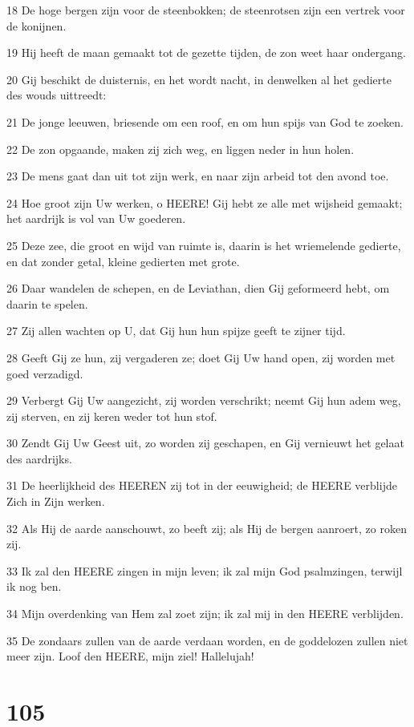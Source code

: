 \par 18 De hoge bergen zijn voor de steenbokken; de steenrotsen zijn een vertrek voor de konijnen.
\par 19 Hij heeft de maan gemaakt tot de gezette tijden, de zon weet haar ondergang.
\par 20 Gij beschikt de duisternis, en het wordt nacht, in denwelken al het gedierte des wouds uittreedt:
\par 21 De jonge leeuwen, briesende om een roof, en om hun spijs van God te zoeken.
\par 22 De zon opgaande, maken zij zich weg, en liggen neder in hun holen.
\par 23 De mens gaat dan uit tot zijn werk, en naar zijn arbeid tot den avond toe.
\par 24 Hoe groot zijn Uw werken, o HEERE! Gij hebt ze alle met wijsheid gemaakt; het aardrijk is vol van Uw goederen.
\par 25 Deze zee, die groot en wijd van ruimte is, daarin is het wriemelende gedierte, en dat zonder getal, kleine gedierten met grote.
\par 26 Daar wandelen de schepen, en de Leviathan, dien Gij geformeerd hebt, om daarin te spelen.
\par 27 Zij allen wachten op U, dat Gij hun hun spijze geeft te zijner tijd.
\par 28 Geeft Gij ze hun, zij vergaderen ze; doet Gij Uw hand open, zij worden met goed verzadigd.
\par 29 Verbergt Gij Uw aangezicht, zij worden verschrikt; neemt Gij hun adem weg, zij sterven, en zij keren weder tot hun stof.
\par 30 Zendt Gij Uw Geest uit, zo worden zij geschapen, en Gij vernieuwt het gelaat des aardrijks.
\par 31 De heerlijkheid des HEEREN zij tot in der eeuwigheid; de HEERE verblijde Zich in Zijn werken.
\par 32 Als Hij de aarde aanschouwt, zo beeft zij; als Hij de bergen aanroert, zo roken zij.
\par 33 Ik zal den HEERE zingen in mijn leven; ik zal mijn God psalmzingen, terwijl ik nog ben.
\par 34 Mijn overdenking van Hem zal zoet zijn; ik zal mij in den HEERE verblijden.
\par 35 De zondaars zullen van de aarde verdaan worden, en de goddelozen zullen niet meer zijn. Loof den HEERE, mijn ziel! Hallelujah!

\chapter{105}


